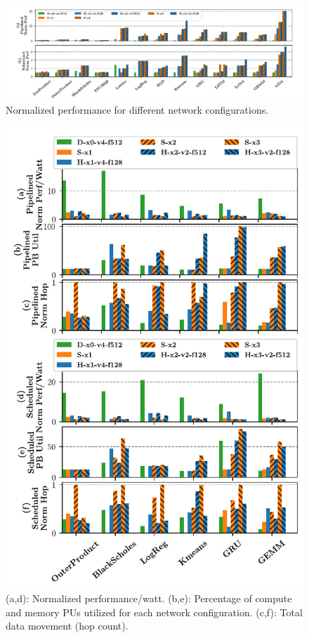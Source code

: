 \begin{figure}
\centering
\includegraphics[width=1\linewidth]{figs/perf.pdf}
  \caption{Normalized performance for different network configurations.}\label{fig:perf}
\end{figure}

\begin{figure}
\centering
  \includegraphics[width=1\columnwidth]{figs/energy.pdf} 
\caption{(a,d): Normalized performance/watt. (b,e): Percentage of compute and memory PUs utilized for each network configuration. 
  (c,f): Total data movement (hop count).}
\label{fig:energy}
\end{figure}

